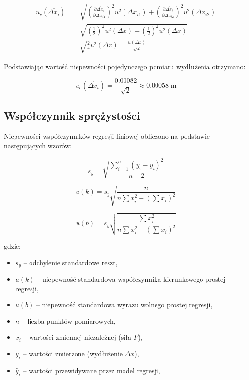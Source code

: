 \documentclass[a4paper,12pt]{article}
\begin{document}
\begin{align*}
    u_c(\overline{\Delta x_i}) & = \sqrt{\left(\frac{\partial \overline{\Delta x_i}}{\partial \Delta x_{i1}}\right)^2 u^2(\Delta x_{i1}) + \left(\frac{\partial \overline{\Delta x_i}}{\partial \Delta x_{i2}}\right)^2 u^2(\Delta x_{i2})} \\
                               & = \sqrt{\left(\frac{1}{2}\right)^2 u^2(\Delta x) + \left(\frac{1}{2}\right)^2 u^2(\Delta x)}                                                                                                               \\
                               & = \sqrt{\frac{2}{4} u^2(\Delta x)} = \frac{u(\Delta x)}{\sqrt{2}}
\end{align*}

Podstawiając wartość niepewności pojedynczego pomiaru wydłużenia otrzymano:

\begin{equation*}
    u_c(\overline{\Delta x_i}) = \frac{0.00082}{\sqrt{2}} \approx 0.00058 \text{ m}
\end{equation*}


\subsection{Współczynnik sprężystości}

Niepewności współczynników regresji liniowej obliczono na podstawie następujących wzorów:

\[
    s_y = \sqrt{\frac{\sum_{i=1}^{n} (y_i - \hat{y}_i)^2}{n-2}}
\]

\[
    u(k) = s_y \sqrt{\frac{n}{n \sum x_i^2 - \left( \sum x_i \right)^2}}
\]

\[
    u(b) = s_y \sqrt{\frac{\sum x_i^2}{n \sum x_i^2 - \left( \sum x_i \right)^2}}
\]

gdzie:

\begin{itemize}
    \setlength{\itemsep}{0em}
    \item $s_y$ -- odchylenie standardowe reszt,
    \item $u(k)$ -- niepewność standardowa współczynnika kierunkowego prostej regresji,
    \item $u(b)$ -- niepewność standardowa wyrazu wolnego prostej regresji,
    \item $n$ -- liczba punktów pomiarowych,
    \item $x_i$ -- wartości zmiennej niezależnej (siła $F$),
    \item $y_i$ -- wartości zmierzone (wydłużenie $\Delta x$),
    \item $\hat{y}_i$ -- wartości przewidywane przez model regresji,
\end{itemize}
\end{document}

